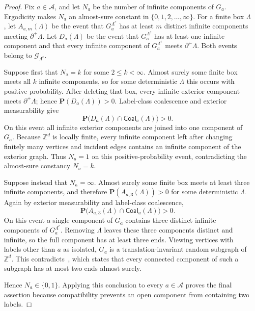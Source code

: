 \documentclass[11pt]{article}
\numberwithin{theorem}{section}
\theoremstyle{remark}
\begin{document}
\begin{proof}
Fix $a\in\mathcal{A}$, and let $N_a$ be the number of infinite components of $G_a$.
Ergodicity makes $N_a$ an almost-sure constant in $\{0,1,2,\ldots,\infty\}$.
For a finite box $\Lambda$, let $A_{a,m}(\Lambda)$ be the event that $G_a^{\Lambda^c}$ has at least $m$ distinct infinite components meeting $\partial^+\Lambda$.
Let $D_a(\Lambda)$ be the event that $G_a^{\Lambda^c}$ has at least one infinite component and that every infinite component of $G_a^{\Lambda^c}$ meets $\partial^+\Lambda$.
Both events belong to $\mathscr{G}_{\Lambda^c}$.

Suppose first that $N_a=k$ for some $2\leq k<\infty$.
Almost surely some finite box meets all $k$ infinite components, so for some deterministic $\Lambda$ this occurs with positive probability.
After deleting that box, every infinite exterior component meets $\partial^+\Lambda$; hence $\mathbf{P}(D_a(\Lambda))>0$.
Label-class coalescence and exterior measurability give
\[
  \mathbf{P}\bigl(D_a(\Lambda)\cap
                   \mathsf{Coal}_a(\Lambda)\bigr)>0.
\]
On this event all infinite exterior components are joined into one component of $G_a$.
Because $\mathbb{Z}^d$ is locally finite, every infinite component left after changing finitely many vertices and incident edges contains an infinite component of the exterior graph.
Thus $N_a=1$ on this positive-probability event, contradicting the almost-sure constancy $N_a=k$.

Suppose instead that $N_a=\infty$.
Almost surely some finite box meets at least three infinite components, and therefore $\mathbf{P}(A_{a,3}(\Lambda))>0$ for some deterministic $\Lambda$.
Again by exterior measurability and label-class coalescence,
\[
  \mathbf{P}\bigl(A_{a,3}(\Lambda)\cap
                   \mathsf{Coal}_a(\Lambda)\bigr)>0.
\]
On this event a single component of $G_a$ contains three distinct infinite components of $G_a^{\Lambda^c}$.
Removing $\Lambda$ leaves these three components distinct and infinite, so the full component has at least three ends.
Viewing vertices with labels other than $a$ as isolated, $G_a$ is a translation-invariant random subgraph of $\mathbb{Z}^d$.
This contradicts~\cite[Proposition~3.3]{HH2023}, which states that every connected component of such a subgraph has at most two ends almost surely.

Hence $N_a\in\{0,1\}$.
Applying this conclusion to every $a\in\mathcal{A}$ proves the final assertion because compatibility prevents an open component from containing two labels.
\end{proof}
\end{document}
